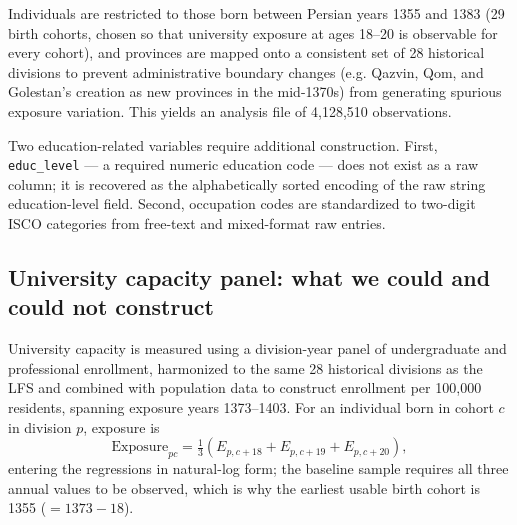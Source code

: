 \documentclass[11pt]{article}
\begin{document}
Individuals are restricted to those born between Persian years 1355 and 1383 (29 birth cohorts, chosen so that university exposure at ages 18--20 is observable for every cohort), and provinces are mapped onto a consistent set of 28 historical divisions to prevent administrative boundary changes (e.g. Qazvin, Qom, and Golestan's creation as new provinces in the mid-1370s) from generating spurious exposure variation. This yields an analysis file of 4{,}128{,}510 observations.

Two education-related variables require additional construction. First, \texttt{educ\_level} --- a required numeric education code --- does not exist as a raw column; it is recovered as the alphabetically sorted encoding of the raw string education-level field. Second, occupation codes are standardized to two-digit ISCO categories from free-text and mixed-format raw entries.

\subsection{University capacity panel: what we could and could not construct}
\label{sec:capacity-data}

University capacity is measured using a division-year panel of undergraduate and professional enrollment, harmonized to the same 28 historical divisions as the LFS and combined with population data to construct enrollment per 100{,}000 residents, spanning exposure years 1373--1403. For an individual born in cohort $c$ in division $p$, exposure is
\begin{equation}
\text{Exposure}_{pc} = \tfrac{1}{3}\left(E_{p,c+18} + E_{p,c+19} + E_{p,c+20}\right),
\end{equation}
entering the regressions in natural-log form; the baseline sample requires all three annual values to be observed, which is why the earliest usable birth cohort is 1355 ($=1373-18$).
\end{document}
